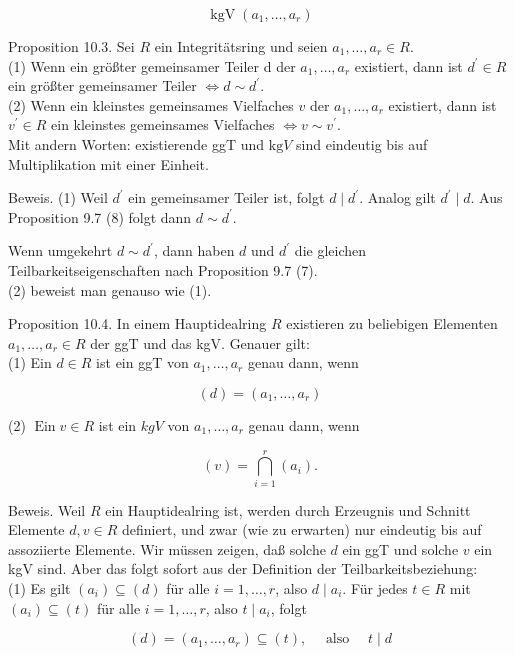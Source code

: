 \documentclass[10pt, letterpaper]{article}
\begin{document}
$$
\operatorname{kgV}\left(a_{1}, \ldots, a_{r}\right)
$$

Proposition 10.3. Sei $R$ ein Integritätsring und seien $a_{1}, \ldots, a_{r} \in R$.\\
(1) Wenn ein größter gemeinsamer Teiler d der $a_{1}, \ldots, a_{r}$ existiert, dann ist $d^{\prime} \in R$ ein größter gemeinsamer Teiler $\Longleftrightarrow d \sim d^{\prime}$.\\
(2) Wenn ein kleinstes gemeinsames Vielfaches $v$ der $a_{1}, \ldots, a_{r}$ existiert, dann ist $v^{\prime} \in R$ ein kleinstes gemeinsames Vielfaches $\Longleftrightarrow v \sim v^{\prime}$.\\
Mit andern Worten: existierende ggT und $\mathrm{kg} V$ sind eindeutig bis auf Multiplikation mit einer Einheit.

Beweis. (1) Weil $d^{\prime}$ ein gemeinsamer Teiler ist, folgt $d \mid d^{\prime}$. Analog gilt $d^{\prime} \mid d$. Aus Proposition 9.7 (8) folgt dann $d \sim d^{\prime}$.

Wenn umgekehrt $d \sim d^{\prime}$, dann haben $d$ und $d^{\prime}$ die gleichen Teilbarkeitseigenschaften nach Proposition 9.7 (7).\\
(2) beweist man genauso wie (1).

Proposition 10.4. In einem Hauptidealring $R$ existieren zu beliebigen Elementen $a_{1}, \ldots, a_{r} \in R$ der ggT und das kgV. Genauer gilt:\\
(1) Ein $d \in R$ ist ein ggT von $a_{1}, \ldots, a_{r}$ genau dann, wenn

$$
(d)=\left(a_{1}, \ldots, a_{r}\right)
$$

(2) $\operatorname{Ein} v \in R$ ist ein $k g V$ von $a_{1}, \ldots, a_{r}$ genau dann, wenn

$$
(v)=\bigcap_{i=1}^{r}\left(a_{i}\right) .
$$

Beweis. Weil $R$ ein Hauptidealring ist, werden durch Erzeugnis und Schnitt Elemente $d, v \in R$ definiert, und zwar (wie zu erwarten) nur eindeutig bis auf assoziierte Elemente. Wir müssen zeigen, daß solche $d$ ein ggT und solche $v$ ein kgV sind. Aber das folgt sofort aus der Definition der Teilbarkeitsbeziehung:\\
(1) Es gilt $\left(a_{i}\right) \subseteq(d)$ für alle $i=1, \ldots, r$, also $d \mid a_{i}$. Für jedes $t \in R$ mit $\left(a_{i}\right) \subseteq(t)$ für alle $i=1, \ldots, r$, also $t \mid a_{i}$, folgt

$$
(d)=\left(a_{1}, \ldots, a_{r}\right) \subseteq(t), \quad \text { also } \quad t \mid d
$$
\end{document}
